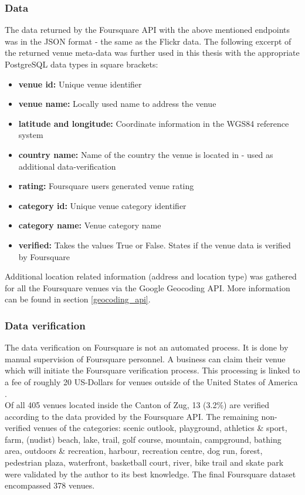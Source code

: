 \subsubsection*{Data} \label{fq_data}
The data returned by the Foursquare API with the above mentioned endpoints was in the JSON format - the same as the Flickr data.
The following excerpt of the returned venue meta-data was further used in this thesis with the appropriate PostgreSQL data types in square brackets: \\
\begin{itemize}[label={}]
    \item \textbf{venue id:} Unique venue identifier 
    \item \textbf{venue name:} Locally used name to address the venue 
    \item \textbf{latitude and longitude:} Coordinate information in the WGS84 reference system 
    \item \textbf{country name:} Name of the country the venue is located in - used as additional data-verification 
    \item \textbf{rating:} Foursquare users generated venue rating 
    \item \textbf{category id:} Unique venue category identifier 
    \item \textbf{category name:} Venue category name 
    \item \textbf{verified:} Takes the values True or False. States if the venue data is verified by Foursquare 
\end{itemize}

Additional location related information (address and location type) was gathered for all the Foursquare venues via the Google Geocoding API. More information can be found in section \ref{geocoding_api}.

\subsubsection*{Data verification} \label{foursquare_data_verification}
The data verification on Foursquare is not an automated process. It is done by manual supervision of Foursquare personnel. A business can claim their venue which will initiate the Foursquare verification process. This processing is linked to a fee of roughly 20 US-Dollars for venues outside of the United States of America \parencite{Foursquare2019}. \\
Of all 405 venues located inside the Canton of Zug, 13 (3.2\%) are verified according to the data provided by the Foursquare API. The remaining non-verified venues of the categories: scenic outlook, playground, athletics \& sport, farm, (nudist) beach, lake, trail, golf course, mountain, campground, bathing area, outdoors \& recreation, harbour, recreation centre, dog run, forest, pedestrian plaza, waterfront, basketball court, river, bike trail and skate park were validated by the author to its best knowledge. The final Foursquare dataset encompassed 378 venues.

